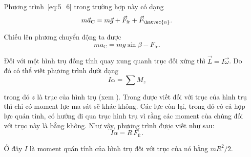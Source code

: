 Phương trình~\eqref{eq:5_6} trong trường hợp này có dạng
\begin{equation*}
	m\vec{a}_{\text{C}} = m\vec{g} + \vec{F}_{\text{fr}} + \vec{F}_{\hatvec{n}}.
\end{equation*}

\noindent
Chiếu lên phương chuyển động ta được
\begin{equation}\label{eq:5_63}
	ma_{\text{C}} = mg\sin\beta - F_{\text{fr}}.
\end{equation}

Đối với một hình trụ đồng tính quay xung quanh trục đối xứng thì $\vec{L}=I\vec{\omega}$. Do đó có thể viết phương trình  dưới dạng
\begin{equation}\label{eq:5_64}
	I\alpha = \sum M_z
\end{equation}

\noindent
trong đó $z$ là trục của hình trụ (xem ). Trong  được viết đối với trục của hình trụ thì chỉ có moment lực ma sát sẽ khác không. Các lực còn lại, trong đó có cả hợp lực quán tính, có hướng đi qua trục hình trụ vì rằng các moment của chúng đối với trục này là bằng không. Như vậy, phương trình  được viết như sau:
\begin{equation}\label{eq:5_65}
	I\alpha = R\,F_{\text{fr}}.
\end{equation}

\noindent
Ở đây $I$ là moment quán tính của hình trụ đối với trục của nó bằng $mR^2/2$.


